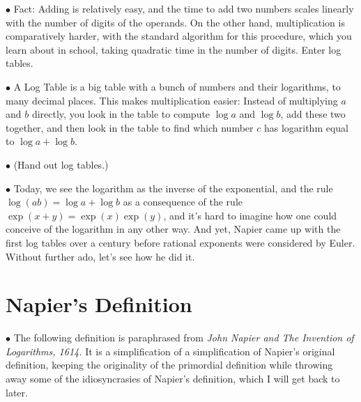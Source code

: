 \documentclass{article}
\newcommand\point[1]{\noindent \hspace{\labelsep} $\bullet$ #1 \smallskip}
\begin{document}



\point{Fact: Adding is relatively easy, and the time to add two numbers scales linearly with the number of digits of the operands. On the other hand, multiplication is comparatively harder, with the standard algorithm for this procedure, which you learn about in school, taking quadratic time in the number of digits. Enter log tables.}

\point{A Log Table is a big table with a bunch of numbers and their logarithms, to many decimal places. This makes multiplication easier: Instead of multiplying $a$ and $b$ directly, you look in the table to compute $\log a$ and $\log b$, add these two together, and then look in the table to find which number $c$ has logarithm equal to $\log a + \log b$.}

\point{(Hand out log tables.)}

\point{Today, we see the logarithm as the inverse of the exponential, and the rule $\log(ab) = \log a + \log b$ as a consequence of the rule $\exp(x+y) = \exp(x) \exp(y)$, and it's hard to imagine how one could conceive of the logarithm in any other way. And yet, Napier came up with the first log tables over a century before rational exponents were considered by Euler. Without further ado, let's see how he did it.}

\section{Napier's Definition}

\point{The following definition is paraphrased from \textit{John Napier and The Invention of Logarithms, 1614.} It is a simplification of a simplification of Napier's original definition, keeping the originality of the primordial definition while throwing away some of the idiosyncrasies of Napier's definition, which I will get back to later.}
\end{document}
